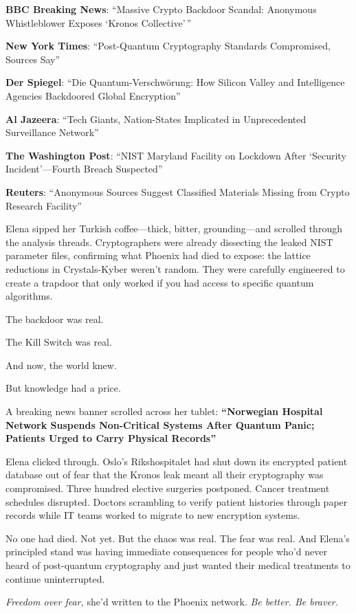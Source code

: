\textbf{BBC Breaking News}: ``Massive Crypto Backdoor Scandal: Anonymous Whistleblower Exposes `Kronos Collective'\,''

\textbf{New York Times}: ``Post-Quantum Cryptography Standards Compromised, Sources Say''

\textbf{Der Spiegel}: ``Die Quantum-Verschwörung: How Silicon Valley and Intelligence Agencies Backdoored Global Encryption''

\textbf{Al Jazeera}: ``Tech Giants, Nation-States Implicated in Unprecedented Surveillance Network''

\textbf{The Washington Post}: ``NIST Maryland Facility on Lockdown After `Security Incident'---Fourth Breach Suspected''

\textbf{Reuters}: ``Anonymous Sources Suggest Classified Materials Missing from Crypto Research Facility''

Elena sipped her Turkish coffee---thick, bitter, grounding---and scrolled through the analysis threads. Cryptographers were already dissecting the leaked NIST parameter files, confirming what Phoenix had died to expose: the lattice reductions in Crystals-Kyber weren't random. They were carefully engineered to create a trapdoor that only worked if you had access to specific quantum algorithms.

The backdoor was real.

The Kill Switch was real.

And now, the world knew.

But knowledge had a price.

A breaking news banner scrolled across her tablet: \textbf{``Norwegian Hospital Network Suspends Non-Critical Systems After Quantum Panic; Patients Urged to Carry Physical Records''}

Elena clicked through. Oslo's Rikshospitalet had shut down its encrypted patient database out of fear that the Kronos leak meant all their cryptography was compromised. Three hundred elective surgeries postponed. Cancer treatment schedules disrupted. Doctors scrambling to verify patient histories through paper records while IT teams worked to migrate to new encryption systems.

No one had died. Not yet. But the chaos was real. The fear was real. And Elena's principled stand was having immediate consequences for people who'd never heard of post-quantum cryptography and just wanted their medical treatments to continue uninterrupted.

\emph{Freedom over fear,} she'd written to the Phoenix network. \emph{Be better. Be braver.}

